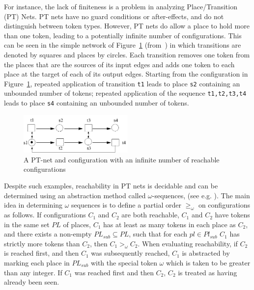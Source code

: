 For instance, the lack of finiteness is a problem in analyzing
Place/Transition (PT) Nets.  PT nets have no guard conditions or
after-effects, and do not distinguish between token types.  However,
PT nets do allow a place to hold more than one token, leading to a
potentially infinite number of configurations.  This can be seen in
the simple network of Figure~\ref{fig:ptnet} (from~\cite{DesR98}) in
which transitions are denoted by squares and places by circles.  Each
transition removes one token from the places that are the sources
of its input edges and adds one token to each place at the target of
each of its output edges.  Starting from the configuration in
Figure~\ref{fig:ptnet}, repeated application of transition {\tt t1}
leads to place {\tt s2} containing an unbounded number of tokens;
repeated application of the sequence {\tt t1,t2,t3,t4} leads to place
{\tt s4} containing an unbounded number of tokens.
%
\begin{figure}
\centering
\includegraphics[width=0.5\textwidth]{omegaNet}
\caption{A PT-net and configuration with an infinite number of reachable configurations} 
\label{fig:ptnet}
\end{figure}
%

Despite such examples, reachability in PT nets is decidable and can be
determined using an abstraction method called $\omega$-sequences, (see
e.g. \cite{DesR98}).  The main idea in determining $\omega$ sequences
is to define a partial order $\geq_{\omega}$ on configurations as
follows.  If configurations $C_1$ and $C_2$ are both reachable, $C_1$
and $C_2$ have tokens in the same set $PL$ of places, $C_1$ has at
least as many tokens in each place as $C_2$, and there exists a
non-empty $PL_{sub} \subseteq PL$, such that for each $pl \in
Pl_{sub}$ $C_1$ has strictly more tokens than $C_2$, then $C_1
>_{\omega} C_2$.  When evaluating reachability, if $C_2$ is reached
first, and then $C_1$ was subsequently reached, $C_1$ is abstracted by
marking each place in $PL_{sub}$ with the special token $\omega$ which
is taken to be greater than any integer.  If $C_1$ was reached first
and then $C_2$, $C_2$ is treated as having already been seen.

